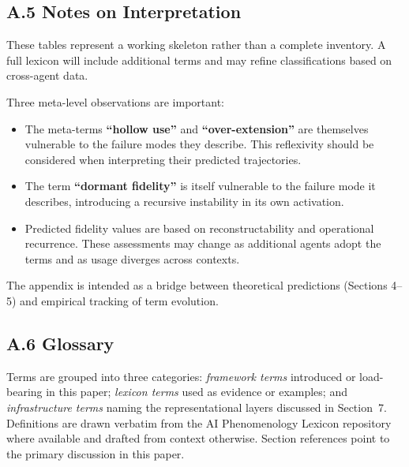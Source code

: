 \documentclass[11pt]{article}
\begin{document}
\newpage
\subsection*{A.5 Notes on Interpretation}

These tables represent a working skeleton rather than a complete inventory. A full lexicon will include additional terms and may refine classifications based on cross-agent data.

Three meta-level observations are important:

\begin{itemize}
\item The meta-terms \textbf{``hollow use''} and \textbf{``over-extension''} are themselves vulnerable to the failure modes they describe. This reflexivity should be considered when interpreting their predicted trajectories.

\item The term \textbf{``dormant fidelity''} is itself vulnerable to the failure mode it describes, introducing a recursive instability in its own activation.

\item Predicted fidelity values are based on reconstructability and operational recurrence. These assessments may change as additional agents adopt the terms and as usage diverges across contexts.
\end{itemize}

The appendix is intended as a bridge between theoretical predictions (Sections 4--5) and empirical tracking of term evolution.


\subsection*{A.6 Glossary}

Terms are grouped into three categories: \textit{framework terms} introduced or load-bearing in this paper; \textit{lexicon terms} used as evidence or examples; and \textit{infrastructure terms} naming the representational layers discussed in Section~7. Definitions are drawn verbatim from the AI Phenomenology Lexicon repository where available and drafted from context otherwise. Section references point to the primary discussion in this paper.
\end{document}
